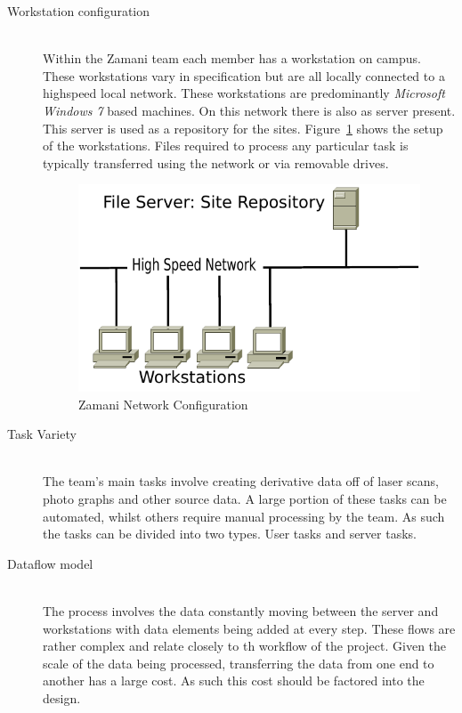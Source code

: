 \documentclass[12pt,a4paper]{report}
\begin{document}
\begin{description}
    \item[Workstation configuration] \hfill \\
        Within the Zamani team each member has a workstation on campus.
        These workstations vary in specification but are all locally
        connected to a highspeed local network. These workstations are
        predominantly \emph{Microsoft Windows 7} based machines.  On this
        network there is also as server present. This server is used as
        a repository for the sites. Figure~\ref{network_setup} shows the setup
        of the workstations. Files required to process any particular task is
        typically transferred using the network or via removable drives.
\begin{figure}[!h]
    \begin{center}
        \includegraphics[scale=0.6]{figures/networklayout.pdf}
    \end{center}
    \caption{Zamani Network Configuration}
    \label{network_setup}
\end{figure}
    \item[Task Variety] \hfill \\
        The team's main tasks involve creating derivative data off of laser
        scans, photo graphs and other source data. A large portion of these
        tasks can be automated, whilst others require manual processing by the
        team. As such the tasks can be divided into two types. User tasks and
        server tasks.


    \item[Dataflow model] \hfill \\
        The process involves the data constantly moving between the server
        and workstations with data elements being added at every step. These
        flows are rather complex and relate closely to th workflow of the
        project.  Given the scale of the data being processed, transferring the data
        from one end to another has a large cost. As such this cost should
        be factored into the design.



\end{description}
\end{document}
